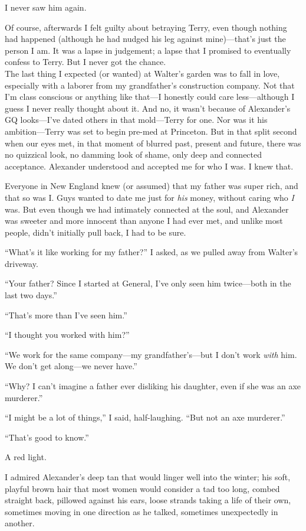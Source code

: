 I never saw him again.

Of course, afterwards I felt guilty about betraying Terry, even though
nothing had happened (although he had nudged his leg against
mine)---that's just the person I am. It was a lapse in judgement; a
lapse that I promised to eventually confess to Terry. But I never got
the chance.\\

The last thing I expected (or wanted) at Walter's garden was to fall in
love, especially with a laborer from my grandfather's construction
company. Not that I'm class conscious or anything like that---I honestly
could care less---although I guess I never really thought about it. And
no, it wasn't because of Alexander's GQ looks---I've dated others in
that mold---Terry for one. Nor was it his ambition---Terry was set to
begin pre-med at Princeton. But in that split second when our eyes met,
in that moment of blurred past, present and future, there was no
quizzical look, no damming look of shame, only deep and connected
acceptance. Alexander understood and accepted me for who I was. I knew
that.

Everyone in New England knew (or assumed) that my father was super rich,
and that so was I. Guys wanted to date me just for \emph{his} money,
without caring who \emph{I} was. But even though we had intimately
connected at the soul, and Alexander was sweeter and more innocent than
anyone I had ever met, and unlike most people, didn't initially pull
back, I had to be sure.

``What's it like working for my father?'' I asked, as we pulled away
from Walter's driveway.

``Your father? Since I started at General, I've only seen him
twice---both in the last two days.''

``That's more than I've seen him.''

``I thought you worked with him?''

``We work for the same company---my grandfather's---but I don't work
\emph{with} him. We don't get along---we never have.''

``Why? I can't imagine a father ever disliking his daughter, even if she
was an axe murderer.''

``I might be a lot of things,'' I said, half-laughing. ``But not an axe
murderer.''

``That's good to know.''

A red light.

I admired Alexander's deep tan that would linger well into the winter;
his soft, playful brown hair that most women would consider a tad too
long, combed straight back, pillowed against his ears, loose strands
taking a life of their own, sometimes moving in one direction as he
talked, sometimes unexpectedly in another.

